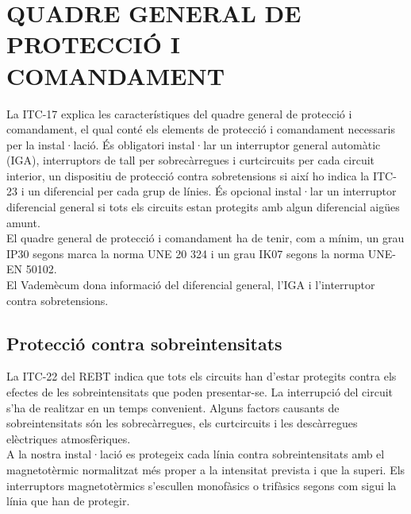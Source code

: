 \chapter{\uppercase{Quadre general de protecció i comandament}}
La ITC-17 explica les característiques del quadre general de protecció i comandament, el qual conté els elements de protecció i comandament necessaris per la instal·lació. És obligatori instal·lar un interruptor general automàtic (IGA), interruptors de tall per sobrecàrregues i curtcircuits per cada circuit interior, un dispositiu de protecció contra sobretensions si així ho indica la ITC-23 i un diferencial per cada grup de línies. És opcional instal·lar un interruptor diferencial general si tots els circuits estan protegits amb algun diferencial aigües amunt.\\
\newline El quadre general de protecció i comandament ha de tenir, com a mínim, un grau IP30 segons marca la norma UNE 20 324 i un grau IK07 segons la norma UNE-EN 50102.\\
\newline El Vademècum dona informació del diferencial general, l'IGA i l'interruptor contra sobretensions.

\section{Protecció contra sobreintensitats}
La ITC-22 del REBT indica que tots els circuits han d'estar protegits contra els efectes de les sobreintensitats que poden presentar-se. La interrupció del circuit s'ha de realitzar en un temps convenient. Alguns factors causants de sobreintensitats són les sobrecàrregues, els curtcircuits i les descàrregues elèctriques atmosfèriques.\\
\newline A la nostra instal·lació es protegeix cada línia contra sobreintensitats amb el magnetotèrmic normalitzat més proper a la intensitat prevista i que la superi. Els interruptors magnetotèrmics s'escullen monofàsics o trifàsics segons com sigui la línia que han de protegir.



